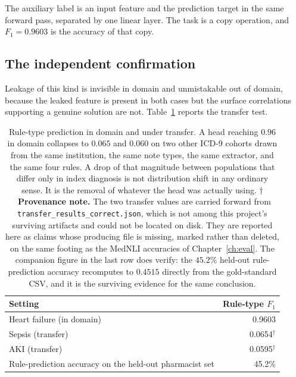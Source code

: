 The auxiliary label is an input feature and the prediction target in the same
forward pass, separated by one linear layer. The task is a copy operation, and
$F_1 = 0.9603$ is the accuracy of that copy.

\subsection{The independent confirmation}

Leakage of this kind is invisible in domain and unmistakable out of domain,
because the leaked feature is present in both cases but the surface correlations
supporting a genuine solution are not. Table~\ref{tab:transfer} reports the
transfer test.

\begin{table}[t]
\centering
\small
\begin{tabular}{lr}
\toprule
\textbf{Setting} & \textbf{Rule-type $F_1$} \\
\midrule
Heart failure (in domain) & 0.9603 \\
Sepsis (transfer)         & 0.0654$^{\dagger}$ \\
AKI (transfer)            & 0.0595$^{\dagger}$ \\
\midrule
Rule-prediction accuracy on the held-out pharmacist set & 45.2\% \\
\bottomrule
\end{tabular}
\caption{Rule-type prediction in domain and under transfer. A head reaching
$0.96$ in domain collapses to $0.065$ and $0.060$ on two other ICD-9 cohorts
drawn from the same institution, the same note types, the same extractor, and
the same four rules. A drop of that magnitude between populations that differ
only in index diagnosis is not distribution shift in any ordinary sense. It is
the removal of whatever the head was actually using. $\dagger$~\textbf{Provenance
note.} The two transfer values are carried forward from
\texttt{transfer\_results\_correct.json}, which is not among this project's
surviving artifacts and could not be located on disk. They are reported here as
claims whose producing file is missing, marked rather than deleted, on the same
footing as the MedNLI accuracies of Chapter~\ref{ch:eval}. The companion figure
in the last row does verify: the $45.2\%$ held-out rule-prediction accuracy
recomputes to $0.4515$ directly from the gold-standard CSV, and it is the
surviving evidence for the same conclusion.}
\label{tab:transfer}
\end{table}


